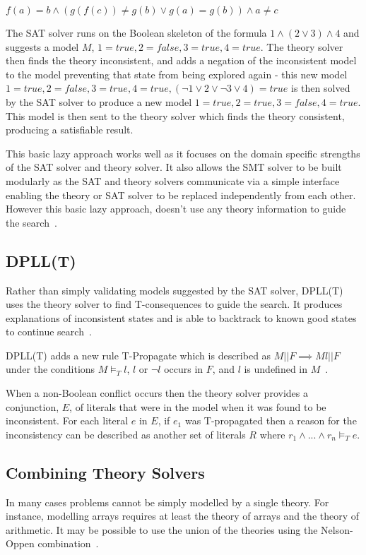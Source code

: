 \documentclass[]{final_report}
\begin{document}
$ f(a) = b \land (g(f(c)) \neq g(b) \lor g(a) = g(b)) \land a \neq c $

The SAT solver runs on the Boolean skeleton of the formula $1 \land (2 \lor 3) \land 4$ and suggests a model $M$, $1 = \mathit{true}, 2 = \mathit{false}, 3 = \mathit{true}, 4 = \mathit{true}$. The theory solver then finds the theory inconsistent, and adds a negation of the inconsistent model to the model preventing that state from being explored again - this new model $ 1 = \mathit{true}, 2 = \mathit{false}, 3 = \mathit{true}, 4 = \mathit{true}, (\lnot 1 \lor 2 \lor \lnot 3 \lor 4 ) = true $ is then solved by the SAT solver to produce a new model $ 1 = \mathit{true}, 2 = \mathit{true}, 3 = \mathit{false}, 4 = \mathit{true}$. This model is then sent to the theory solver which finds the theory consistent, producing a satisfiable result.

This basic lazy approach works well as it focuses on the domain specific strengths of the SAT solver and theory solver. It also allows the SMT solver to be built modularly as the SAT and theory solvers communicate via a simple interface enabling the theory or SAT solver to be replaced independently from each other. However this basic lazy approach, doesn't use any theory information to guide the search~\cite{sattosmt}.

\subsection{DPLL(T)}
Rather than simply validating models suggested by the SAT solver, DPLL(T) uses the theory solver to find T-consequences to guide the search. It produces explanations of inconsistent states and is able to backtrack to known good states to continue search~\cite{smtdpplt, ganzinger2004dpll}.

DPLL(T) adds a new rule T-Propagate which is described as $M || F \implies M l || F $ under the conditions $M \models _T l$, $l$ or $\lnot l$ occurs in $F$, and $l$ is undefined in $M$~\cite{sattosmt}.

When a non-Boolean conflict occurs then the theory solver provides a conjunction, $E$, of literals that were in the model when it was found to be inconsistent. For each literal $e $ in $E$, if $e_1$ was T-propagated then a reason for the inconsistency can be described as another set of literals $R$ where $r_1 \land ... \land r_n \models _T e$. 


\subsection{Combining Theory Solvers}
In many cases problems cannot be simply modelled by a single theory. For instance, modelling arrays requires at least the theory of arrays and the theory of arithmetic. It may be possible to use the union of the theories using the Nelson-Oppen combination~\cite{smtdpplt}. 
\end{document}
